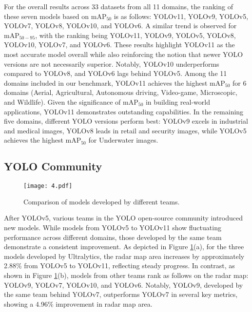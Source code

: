 \documentclass[runningheads]{llncs}
\begin{document}
For the overall results across 33 datasets from all 11 domains, the ranking of these seven models based on mAP$_{50}$ is as follows: YOLOv11, YOLOv9, YOLOv5, YOLOv7, YOLOv8, YOLOv10, and YOLOv6. A similar trend is observed for mAP$_{50-95}$, with the ranking being YOLOv11, YOLOv9, YOLOv5, YOLOv8, YOLOv10, YOLOv7, and YOLOv6. These results highlight YOLOv11 as the most accurate model overall while also reinforcing the notion that newer YOLO versions are not necessarily superior. Notably, YOLOv10 underperforms compared to YOLOv8, and YOLOv6 lags behind YOLOv5. Among the 11 domains included in our benchmark, YOLOv11 achieves the highest mAP$_{50}$ for 6 domains (Aerial, Agricultural, Autonomous driving, Video-game, Microscopic, and Wildlife). Given the significance of mAP$_{50}$ in building real-world applications, YOLOv11 demonstrates outstanding capabilities. In the remaining five domains, different YOLO versions perform best: YOLOv9 excels in industrial and medical images, YOLOv8 leads in retail and security images, while YOLOv5 achieves the highest mAP$_{50}$ for Underwater images.

\subsection{YOLO Community}
\begin{figure}[H]
    \centering
    \texttt{[image: 4.pdf]}
    \caption{Comparison of models developed by different teams.}
    \label{fig:teams_comparison}
\end{figure}


After YOLOv5, various teams in the YOLO open-source community introduced new models. While models from YOLOv5 to YOLOv11 show fluctuating performance across different domains, those developed by the same team  demonstrate a consistent improvement. As depicted in Figure \ref{fig:teams_comparison}(a), for the three models developed by Ultralytics, the radar map area increases by approximately 2.88\% from YOLOv5 to YOLOv11, reflecting steady progress. In contrast, as shown in Figure \ref{fig:teams_comparison}(b), models from other teams rank as follows on the radar map: YOLOv9, YOLOv7, YOLOv10, and YOLOv6. Notably, YOLOv9, developed by the same team behind YOLOv7, outperforms YOLOv7 in several key metrics, showing a 4.96\% improvement in radar map area. 
\end{document}
